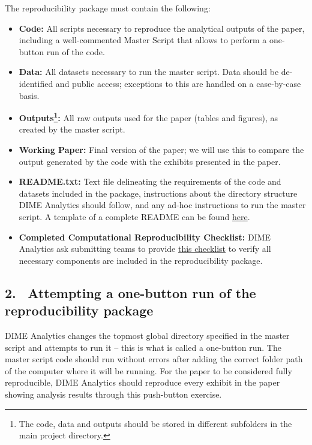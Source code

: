 \begin{fullwidth}
	The reproducibility package must contain the following:

	\bigskip

	\begin{itemize}
		\setlength\itemsep{-0.1em}
		\item \textbf{Code:} All scripts necessary to reproduce the analytical outputs of the paper, including a well-commented Master Script that allows to perform a one-button run of the code.
		\item \textbf{Data:} All datasets necessary to run the master script. Data should be de-identified and public access; exceptions to this are handled on a case-by-case basis.
		\item \textbf{Outputs\footnote{The code, data and outputs should be stored in different subfolders in the main project directory.}:} All raw outputs used for the paper (tables and figures), as created by the master script.
		\item \textbf{Working Paper:} Final version of the paper; we will use this to compare the output generated by the code with the exhibits presented in the paper.
		\item \textbf{README.txt:} Text file delineating the requirements of the code and datasets included in the package, instructions about the directory structure DIME Analytics should follow, and any ad-hoc instructions to run the master script. A template of a complete README can be found \href{https://social-science-data-editors.github.io/template_README/template-README.html}{here}.
		\item \textbf{Completed Computational Reproducibility Checklist:} DIME Analytics ask submitting teams to provide \href{https://raw.githubusercontent.com/worldbank/dime-standards/master/dime-research-standards/pillar-3-research-reproducibility/checklists/Reproducibility%20package%20submission%20checklist.pdf}{this checklist} to verify all necessary components are included in the reproducibility package.
	\end{itemize}

	\subsection{2. \, Attempting a one-button run of the reproducibility package}

	DIME Analytics changes the topmost global directory specified in the master script and attempts to run it – this is what is called a one-button run. The master script code should run without errors after adding the correct folder path of the computer where it will be running. For the paper to be considered fully reproducible, DIME Analytics should reproduce every exhibit in the paper showing analysis results through this push-button exercise.


\end{fullwidth}
